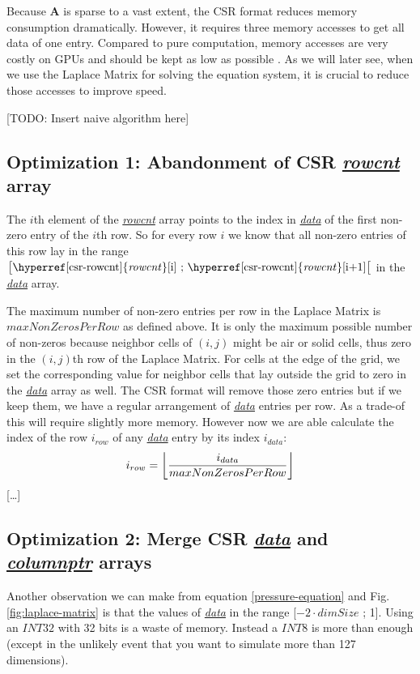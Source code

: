 \newpage
\par Because \textbf{A} is sparse to a vast extent, the CSR format reduces memory consumption dramatically. However, it requires three memory accesses to get all data of one entry. Compared to pure computation, memory accesses are very costly on GPUs and should be kept as low as possible \parencite{fang2018benchmarking}\parencite{fujii2013data}. As we will later see, when we use the Laplace Matrix for solving the equation system, it is crucial to reduce those accesses to improve speed.

[TODO: Insert naive algorithm here]


\subsection{Optimization 1: Abandonment of CSR \hyperref[csr-rowcnt]{\textit{rowcnt}} array}
The $i$th element of the \hyperref[csr-rowcnt]{\textit{rowcnt}} array points to the index in \hyperref[csr-data]{\textit{data}} of the first non-zero entry of the $i$th row. So for every row $i$ we know that all non-zero entries of this row lay in the range $\big[\text{\hyperref[csr-rowcnt]{\textit{rowcnt}}[i] ; \hyperref[csr-rowcnt]{\textit{rowcnt}}[i+1]}\big[$ in the \hyperref[csr-data]{\textit{data}} array. 
\par The maximum number of non-zero entries per row in the Laplace Matrix is $maxNonZerosPerRow$ as defined above. It is only the maximum possible number of non-zeros because neighbor cells of $(i,j)$ might be air or solid cells, thus zero in the $(i,j)$th row of the Laplace Matrix. For cells at the edge of the grid, we set the corresponding value for neighbor cells that lay outside the grid to zero in the \hyperref[csr-data]{\textit{data}} array as well. The CSR format will remove those zero entries but if we keep them, we have a regular arrangement of \hyperref[csr-data]{\textit{data}} entries per row. As a trade-of this will require slightly more memory. However now we are able calculate the index of the row $i_{row}$ of any \hyperref[csr-data]{\textit{data}} entry by its index $i_{data}$:
\begin{equation} \label{row-index-by-data-index}
	i_{row} = \floor*{\frac{i_{data}}{maxNonZerosPerRow}}
\end{equation}
[\dots]
\newpage

\subsection{Optimization 2: Merge CSR \hyperref[csr-data]{\textit{data}} and \hyperref[csr-columnptr]{\textit{columnptr}} arrays}
Another observation we can make from equation \ref{pressure-equation} and Fig. \ref{fig:laplace-matrix} is that the values of \hyperref[csr-data]{\textit{data}} in the range [$-2 \cdot dimSize$ ; 1]. Using an $INT32$ with 32 bits is a waste of memory. Instead a $INT8$ is more than enough (except in the unlikely event that you want to simulate more than 127 dimensions).  

